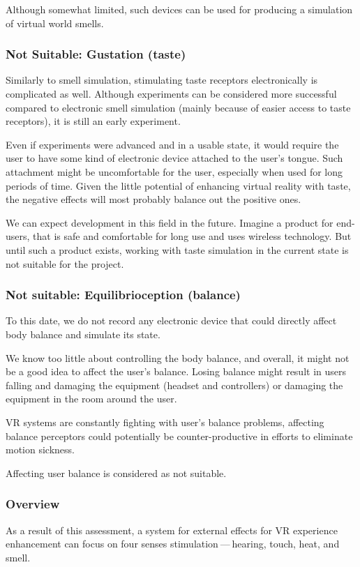 Although somewhat limited, such devices can be used for producing a simulation
of virtual world smells.


\hypertarget{x-not-suitable:-gustation-(taste)}{\subsubsection*{Not Suitable: Gustation (taste)}}
Similarly to smell simulation, stimulating taste receptors electronically is
complicated as well. Although experiments can be considered more successful
compared to electronic smell simulation (mainly because of easier access
to taste receptors), it is still an early experiment. \hyperlink{stsie}{}


Even if experiments were advanced and in a usable state, it would
require the user to have some kind of electronic device attached to the user’s
tongue. Such attachment might be uncomfortable for the user, especially when
used for long periods of time. Given the little potential of enhancing virtual
reality with taste, the negative effects will most probably balance out
the positive ones.


We can expect development in this field in the future. Imagine a product
for end-users, that is safe and comfortable for long use and uses wireless
technology. But until such a product exists, working with taste simulation
in the current state is not suitable for the project.


\hypertarget{x-not-suitable:-equilibrioception-(balance)}{\subsubsection*{Not suitable: Equilibrioception (balance)}}
To this date, we do not record any electronic device that could
directly affect body balance and simulate its state.


We know too little about controlling the body balance, and overall,
it might not be a good idea to affect the user’s balance. Losing
balance might result in users falling and damaging the equipment (headset and
controllers) or damaging the equipment in the room around the user.


VR systems are constantly fighting with user’s balance problems,
affecting balance perceptors could potentially be
counter-productive in efforts to eliminate motion sickness.


Affecting user balance is considered as not suitable.


\hypertarget{x-overview}{\subsubsection*{Overview}}
As a result of this assessment, a system for external effects for VR experience
enhancement can focus on four senses stimulation — hearing, touch, heat,
and smell.


